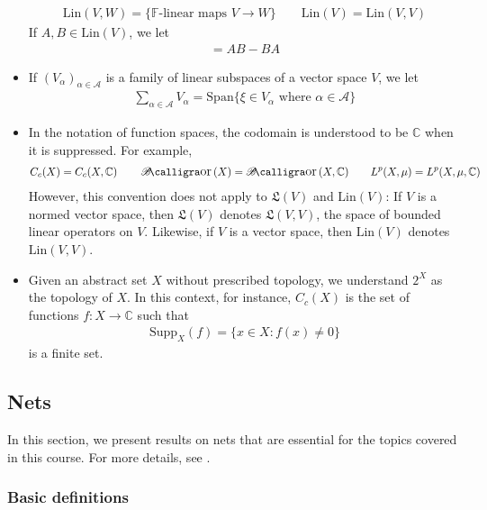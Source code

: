 \documentclass[12pt,b5paper,notitlepage]{article}
\theoremstyle{definition}
\theoremstyle{plain}
\DeclareMathOperator{\Bor}{\mathscr{B}\text{\kern -2pt {\calligra\large or}}\,}
\newcommand{\fk}{\mathfrak}
\newcommand{\Span}{\mathrm{Span}}
\newcommand{\scr}{\mathscr}
\newcommand{\Cbb}{\mathbb C}
\newcommand{\Supp}{\mathrm{Supp}}
\newcommand{\Fbb}{\mathbb F}
\newcommand{\Lin}{\mathrm{Lin}}
\numberwithin{equation}{section}
\begin{document}
\begin{itemize}
\begin{align*}
\Lin(V,W)=\{\text{$\Fbb$-linear maps }V\rightarrow W\}\qquad \Lin(V)=\Lin(V,V)
\end{align*}
If $A,B\in\Lin(V)$, we let
\begin{align*}
[A,B]=AB-BA
\end{align*}
\item If $(V_\alpha)_{\alpha\in\scr A}$ is a family of linear subspaces of a vector space $V$, we let
\begin{align*}
\sum_{\alpha\in\scr A}V_\alpha=\Span\{\xi\in V_\alpha\text{ where }\alpha\in\scr A\}
\end{align*}
\item In the notation of function spaces, the codomain is understood to be $\Cbb$ when it is suppressed. For example,
\begin{gather*}
C_c(X)=C_c(X,\Cbb)\qquad \Bor(X)=\Bor(X,\Cbb)\qquad L^p(X,\mu)=L^p(X,\mu,\Cbb)
\end{gather*}
However, this convention does not apply to $\fk L(V)$ and $\Lin(V)$: If $V$ is a normed vector space, then $\fk L(V)$ denotes $\fk L(V,V)$, the space of bounded linear operators on $V$. Likewise, if $V$ is a vector space, then $\Lin(V)$ denotes $\Lin(V,V)$.
\item Given an abstract set $X$ without prescribed topology, we understand $2^X$ as the topology of $X$. In this context, for instance, $C_c(X)$ is the set of functions $f:X\rightarrow\Cbb$ such that
\begin{align}\label{eq201}
\Supp_X(f)=\{x\in X:f(x)\neq0\}
\end{align}
is a finite set. 
\end{itemize}



\subsection{Nets}


In this section, we present results on nets that are essential for the topics covered in this course. For more details, see \cite{Gui-A}.

\subsubsection{Basic definitions}
\end{document}
